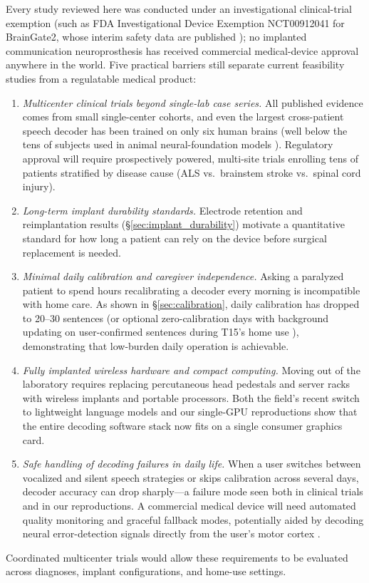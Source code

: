\documentclass[11pt]{article}
\begin{document}
Every study reviewed
here was conducted under an investigational clinical-trial exemption
(such as FDA Investigational Device Exemption NCT00912041 for
BrainGate2, whose interim safety data are published \cite{rubin2023});
no implanted communication neuroprosthesis has received commercial
medical-device approval anywhere in the world. Five practical barriers
still separate current feasibility studies from a regulatable medical
product:
\begin{enumerate}[leftmargin=1.5em,itemsep=2pt]
\item \emph{Multicenter clinical trials beyond single-lab case series.}
All published evidence comes from small single-center cohorts, and even
the largest cross-patient speech decoder has been trained on only six
human brains \cite{fogg2026} (well below the tens of subjects used in
animal neural-foundation models \cite{ye2025}). Regulatory approval will
require prospectively powered, multi-site trials enrolling tens of
patients stratified by disease cause (ALS vs.\ brainstem stroke vs.\
spinal cord injury).
\item \emph{Long-term implant durability standards.} Electrode
retention and reimplantation results (\S\ref{sec:implant_durability})
motivate a quantitative standard for how long a patient can rely on the
device before surgical replacement is needed.
\item \emph{Minimal daily calibration and caregiver independence.}
Asking a paralyzed patient to spend hours recalibrating a decoder every
morning is incompatible with home care. As shown in
\S\ref{sec:calibration}, daily calibration has dropped to 20--30
sentences (or optional zero-calibration days with background updating on
user-confirmed sentences during T15's home use \cite{card2026}),
demonstrating that low-burden daily operation is achievable.
\item \emph{Fully implanted wireless hardware and compact computing.}
Moving out of the laboratory requires replacing percutaneous head
pedestals and server racks with wireless implants \cite{pouratian2026, simeral2021}
and portable processors. Both the field's recent switch to lightweight
language models \cite{fogg2026, yoon2026} and our single-GPU
reproductions show that the entire decoding software stack now fits on a
single consumer graphics card.
\item \emph{Safe handling of decoding failures in daily life.} When a
user switches between vocalized and silent speech strategies or skips
calibration across several days, decoder accuracy can drop sharply---a
failure mode seen both in clinical trials and in our reproductions. A
commercial medical device will need automated quality monitoring and
graceful fallback modes, potentially aided by decoding neural
error-detection signals directly from the user's motor cortex
\cite{hou2025}.
\end{enumerate}
Coordinated multicenter trials would allow these requirements to be
evaluated across diagnoses, implant configurations, and home-use
settings.
\end{document}

